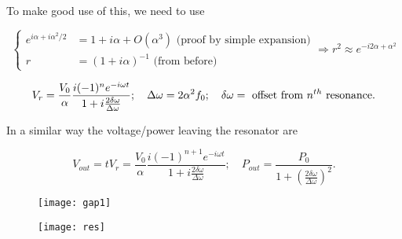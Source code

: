  \noindent To make good use of this, we need to use

 \begin{equation}\label{tlineApprox}
   \left\lbrace
     \begin{aligned}
       e^{i\alpha+i\alpha^2/2} & = 1+i\alpha +O(\alpha^3) \text{ (proof by simple expansion)}\\
       r & = (1+i\alpha)^{-1} \text{ (from before)}
     \end{aligned}\right.\Rightarrow r^2 \approx e^{-i2\alpha
     +\alpha^2}
 \end{equation}

 \noindent {}

 \begin{equation}\label{tlineVoltage}
   V_r = \frac{V_0}{\alpha}\frac{i(-1)^{n}e^{-i\omega t}}{1+i\frac{2\delta\omega}{\Delta\omega}};\quad \Delta\omega = 2\alpha^2f_0;\quad \delta\omega = \text{ offset from $ n^{th} $ resonance}.
 \end{equation}

 \noindent  {}   In a  similar  way the  voltage/power leaving  the
 resonator are

 \begin{equation}\label{tlineLeaving}
   V_{out} = tV_r = \frac{V_0}{\alpha}\frac{i(-1)^{n+1}e^{-i\omega t}}{1+i\frac{2\delta\omega}{\Delta\omega}}; \quad P_{out} = \frac{P_0}{1+\left(\frac{2\delta\omega}{\Delta\omega}\right)^2}.
 \end{equation}

  \begin{figure}[h]
    \centering%
    \texttt{[image: gap1]}
  \end{figure}




   \begin{figure}[h]
     \centering%
     \texttt{[image: res]}
   \end{figure}

